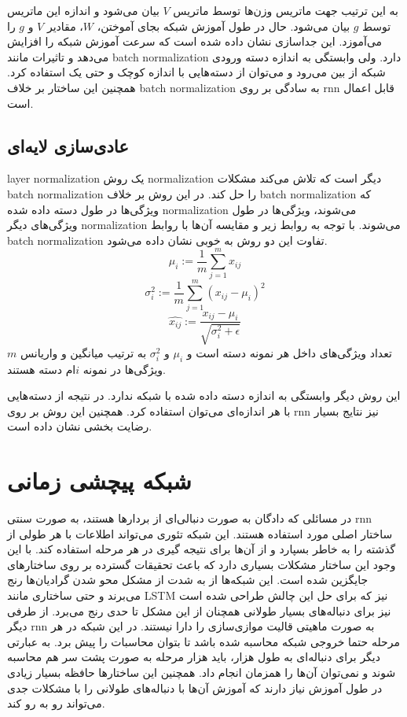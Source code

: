 به این ترتیب جهت ماتریس وزن‌ها توسط ماتریس $V$ بیان می‌شود و اندازه این ماتریس
توسط $g$ بیان می‌شود. حال در طول آموزش شبکه بجای آموختن، $W$، مقادیر $V$ و $g$
را می‌آموزد. این جداسازی نشان داده شده است که سرعت آموزش شبکه را افزایش می‌دهد و
تاثیرات مانند \gls{batch normalization} دارد. ولی وابستگی به اندازه دسته ورودی
شبکه از بین می‌رود و می‌توان از دسته‌هایی با اندازه کوچک و حتی یک استفاده کرد.
همچنین این ساختار بر خلاف \gls{batch normalization} به سادگی بر روی \gls{rnn}
قابل اعمال است.

\subsection{عادی‌سازی لایه‌ای}
\gls{layer normalization}\cite{ba2016layer} یک روش \gls{normalization} دیگر است
که تلاش می‌کند مشکلات \gls{batch normalization} را حل کند. در این روش بر خلاف
\gls{batch normalization} که ویژگی‌ها در طول دسته داده شده \gls{normalization}
می‌شوند، ویژگی‌ها در طول ویژگی‌های دیگر \gls{normalization} می‌شوند. با توجه به
روابط زیر و مقایسه آن‌ها با روابط \gls{batch normalization} تفاوت این دو روش به
خوبی نشان داده می‌شود.
\begin{equation}
    \mu_i := \frac{1}{m} \sum_{j=1}^{m}x_{ij}
\end{equation}
\begin{equation}
    \sigma_i^2 := \frac{1}{m} \sum_{j=1}^{m}(x_{ij} - \mu_i)^2
\end{equation}
\begin{equation}
    \hat{x_{ij}} := \frac{x_{ij} - \mu_i}{\sqrt{\sigma_i^2 + \epsilon}}
\end{equation}
$m$ تعداد ویژگی‌های داخل هر نمونه دسته است و $\mu_i$ و $\sigma_i^2$ به ترتیب
میانگین و واریانس ویژگی‌ها در نمونه $i$ام دسته هستند.

این روش دیگر وابستگی به اندازه دسته داده شده با شبکه ندارد. در نتیجه از
دسته‌هایی با هر اندازه‌ای می‌توان استفاده کرد. همچنین این روش بر روی \gls{rnn}
نیز نتایج بسیار رضایت بخشی نشان داده است.

\section{شبکه پیچشی زمانی}
در مسائلی که دادگان به صورت دنبالی‌ای از بردارها هستند، به صورت سنتی \gls{rnn}
ساختار اصلی مورد استفاده هستند. این شبکه تئوری می‌تواند اطلاعات با هر طولی از
گذشته را به خاطر بسپارد و از آن‌ها برای نتیجه گیری در هر مرحله استفاده کند. با
این وجود این ساختار مشکلات بسیاری دارد که باعث تحقیقات گسترده بر روی ساختارهای
جایگزین شده است. این شبکه‌ها از به شدت از مشکل محو شدن گرادیان‌ها رنج می‌برند و
حتی ساختاری مانند \gls{LSTM} نیز که برای حل این چالش طراحی شده است نیز برای
دنباله‌های بسیار طولانی همچنان از این مشکل تا حدی رنج می‌برد. از طرفی دیگر
\gls{rnn} به صورت ماهیتی قالیت موازی‌سازی را دارا نیستند. در این شبکه در هر
مرحله حتما خروجی شبکه محاسبه شده باشد تا بتوان محاسبات را پیش برد. به عبارتی
دیگر برای دنباله‌ای به طول هزار، باید هزار مرحله به صورت پشت سر هم محاسبه شوند و
نمی‌توان آن‌ها را همزمان انجام داد. همچنین این ساختارها حافظه بسیار زیادی در طول
آموزش نیاز دارند که آموزش آن‌ها با دنباله‌های طولانی را با مشکلات جدی می‌تواند
رو به رو کند.

